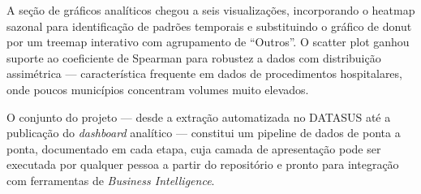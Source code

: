\documentclass[12pt,a4paper]{report}
\begin{document}
A seção de gráficos analíticos chegou a seis visualizações,
incorporando o heatmap sazonal para identificação de padrões temporais e substituindo
o gráfico de donut por um treemap interativo com agrupamento de ``Outros''. O scatter
plot ganhou suporte ao coeficiente de Spearman para robustez a dados com distribuição
assimétrica — característica frequente em dados de procedimentos hospitalares, onde
poucos municípios concentram volumes muito elevados.

O conjunto do projeto — desde a extração automatizada no DATASUS até a publicação
do \textit{dashboard} analítico — constitui um pipeline de dados de ponta a ponta,
documentado em cada etapa, cuja camada de apresentação pode ser executada por qualquer
pessoa a partir do repositório e pronto para integração com ferramentas de
\textit{Business Intelligence}.
\end{document}
